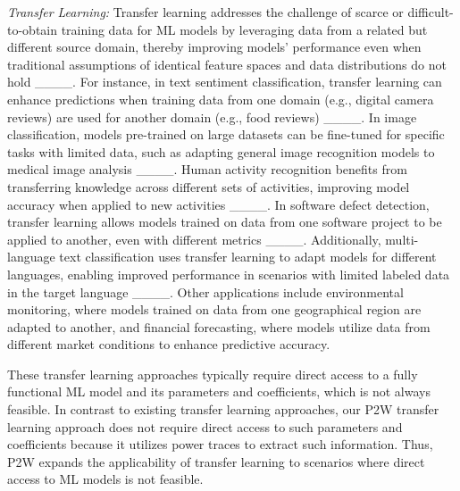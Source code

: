 \emph{Transfer Learning:}
Transfer learning addresses the challenge of scarce or difficult-to-obtain training data for ML models by leveraging data from a related but different source domain, thereby improving models' performance even when traditional assumptions of identical feature spaces and data distributions do not hold ____. For instance, in text sentiment classification, transfer learning can enhance predictions when training data from one domain (e.g., digital camera reviews) are used for another domain (e.g., food reviews) ____. In image classification, models pre-trained on large datasets can be fine-tuned for specific tasks with limited data, such as adapting general image recognition models to medical image analysis ____. Human activity recognition benefits from transferring knowledge across different sets of activities, improving model accuracy when applied to new activities ____. In software defect detection, transfer learning allows models trained on data from one software project to be applied to another, even with different metrics ____. Additionally, multi-language text classification uses transfer learning to adapt models for different languages, enabling improved performance in scenarios with limited labeled data in the target language ____. Other applications include environmental monitoring, where models trained on data from one geographical region are adapted to another, and financial forecasting, where models utilize data from different market conditions to enhance predictive accuracy.

These transfer learning approaches typically require direct access to a fully functional ML model and its parameters and coefficients, which is not always feasible. In contrast to existing transfer learning approaches, our P2W transfer learning approach does not require direct access to such parameters and coefficients because it utilizes power traces to extract such information. Thus, P2W expands the applicability of transfer learning to scenarios where direct access to ML models is not feasible.